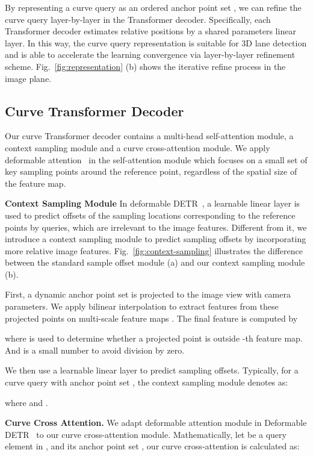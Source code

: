 \documentclass[letterpaper, 10 pt, conference]{ieeeconf}
\begin{document}
By representing a curve query as an ordered anchor point set , we can refine the curve query layer-by-layer in the Transformer decoder. Specifically, each Transformer decoder estimates relative positions  by a shared parameters linear layer. In this way, the curve query representation is suitable for 3D lane detection and is able to accelerate the learning convergence via layer-by-layer refinement scheme. Fig.~\ref{fig:representation} (b) shows the iterative refine process in the image plane.

\subsection{Curve Transformer Decoder}


Our curve Transformer decoder contains a multi-head self-attention module, a context sampling module and a curve cross-attention module. 
We apply deformable attention~\cite{zhu2020deformable} in the self-attention module which focuses on a small set of key sampling points around the reference point, regardless of the spatial size of the feature map.

\noindent\textbf{Context Sampling Module} In deformable DETR~\cite{zhu2020deformable}, a learnable linear layer is used to predict offsets of the sampling locations corresponding to the reference points by queries, which are irrelevant to the image features. 
Different from it, we introduce a context sampling module to predict sampling offsets by incorporating more relative image features.
Fig.~\ref{fig:context-sampling} illustrates the difference between the standard sample offset module (a) and our context sampling module (b). 

First, a dynamic anchor point set  is projected to the image view with camera parameters. We apply bilinear interpolation to extract features from these projected points  on multi-scale feature maps . 
The final feature  is computed by

where  is used to determine whether a projected point  is outside -th feature map. And  is a small number to avoid division by zero.

We then use a learnable linear layer to predict  sampling offsets. Typically, for a curve query  with anchor point set , the context sampling module denotes as:

where  and .

\noindent\textbf{Curve Cross Attention.} We adapt deformable attention module in Deformable
DETR~\cite{zhu2020deformable} to our curve cross-attention module.
Mathematically, let  be a query element in , and its anchor point set , our curve cross-attention is calculated as:
\end{document}
